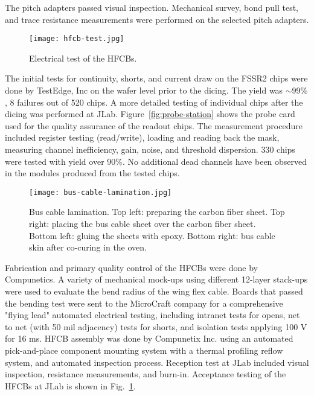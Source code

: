 The pitch adapters passed visual inspection. Mechanical survey, bond pull test, and trace resistance measurements were performed on the selected pitch adapters.

\begin{figure}[hbt] 
\centering 
\texttt{[image: hfcb-test.jpg]}
\caption{Electrical test of the HFCBs.}
\label{fig:hfcb-test}
\end{figure}

The initial tests for continuity, shorts, and current draw on the FSSR2 chips were done by TestEdge, Inc on the wafer level prior to the dicing. The yield was $\sim$99$\%$, 8 failures out of 520 chips. A more detailed testing of individual chips after the dicing was performed at JLab.  Figure~\ref{fig:probe-station} shows the probe card used for the quality assurance of the readout chips. The measurement procedure included register testing (read/write), loading and reading back the mask, measuring channel inefficiency, gain, noise, and threshold dispersion. 330 chips were tested with yield over 90$\%$. No additional dead channels have been observed in the modules produced from the tested chips.  

\begin{figure}[hbt] 
\centering 
\texttt{[image: bus-cable-lamination.jpg]}
\caption{Bus cable lamination. Top left: preparing the carbon fiber sheet. Top right: placing the bus cable sheet over the carbon fiber sheet. Bottom left: gluing the sheets with epoxy. Bottom right: bus cable skin after co-curing in the oven.}
\label{fig:bus-cable-lamination}
\end{figure}

Fabrication and primary quality control of the HFCBs were done by Compunetics. A variety of mechanical mock-ups using different 12-layer stack-ups were used to evaluate the bend radius of the wing flex cable. Boards that passed the bending test were sent to the MicroCraft company for a comprehensive "flying lead" automated electrical testing, including intranet tests for opens, net to net (with 50 mil adjacency) tests for shorts, and isolation tests applying 100 V for 16 ms. HFCB assembly was done by Compunetix Inc. using an automated pick-and-place component mounting system with a thermal profiling reflow system, and automated inspection process. Reception test at JLab included visual inspection, resistance measurements, and burn-in. Acceptance testing of the HFCBs at JLab is shown in Fig.~\ref{fig:hfcb-test}.


